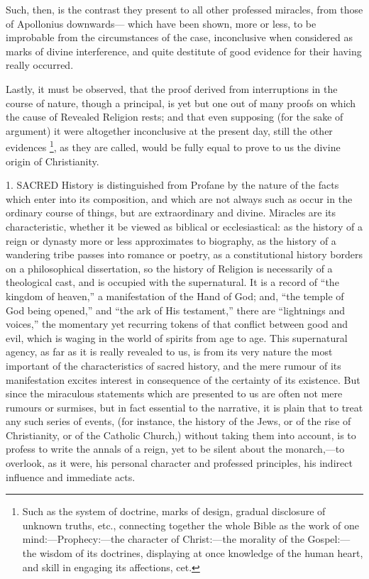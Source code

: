 Such, then, is
the contrast they present to all other professed miracles, from those
of Apollonius downwards— which have been shown, more or less,
to be improbable from the circumstances of the case, inconclusive when
considered as marks of divine interference, and quite destitute of
good evidence for their having really occurred.

Lastly, it must
be observed, that the proof derived from interruptions in the course
of nature, though a principal, is yet but one out of many proofs on
which the cause of Revealed Religion rests; and that even supposing
(for the sake of argument) it were altogether inconclusive at the
present day, still the other evidences \footnote{Such as the system of doctrine, marks of design, gradual disclosure of
unknown truths, etc., connecting together the whole Bible as the work
of one mind:—Prophecy:—the character of Christ:—the morality of
the Gospel:—the wisdom of its doctrines, displaying at once
knowledge of the human heart, and skill in engaging its affections,
cet.}, as they are called, would be fully equal to prove to us the
divine origin of Christianity.



1.
SACRED History is distinguished
from Profane by the nature of the facts which enter into its
composition, and which are not always such as occur in the ordinary
course of things, but are extraordinary and divine. Miracles are its
characteristic, whether it be viewed as biblical or ecclesiastical: as
the history of a reign or dynasty more or less approximates to
biography, as the history of a wandering tribe passes into romance or
poetry, as a constitutional history borders on a philosophical
dissertation, so the history of Religion is necessarily of a
theological cast, and is occupied with the supernatural. It is a
record of ``the kingdom of heaven,'' a manifestation of the Hand of
God; and, ``the temple of God being opened,'' and ``the ark of His
testament,'' there are ``lightnings and voices,'' the momentary yet
recurring tokens of that conflict between good and evil, which is
waging in the world of spirits from age to age. This supernatural
agency, as far as it is really revealed to us, is from its very nature
the most important of the characteristics of sacred history, and the
mere rumour of its manifestation excites interest in consequence of
the certainty of its existence. But since the miraculous statements
which are presented to us are often not mere rumours or surmises, but
in fact essential to the narrative, it is plain that to treat any such
series of events, (for instance, the history of the Jews, or of the
rise of Christianity, or of the Catholic Church,) without taking them
into account, is to profess to write the annals of a reign, yet to be
silent about the monarch,—to overlook, as it were, his personal
character and professed principles, his indirect influence and
immediate acts.


